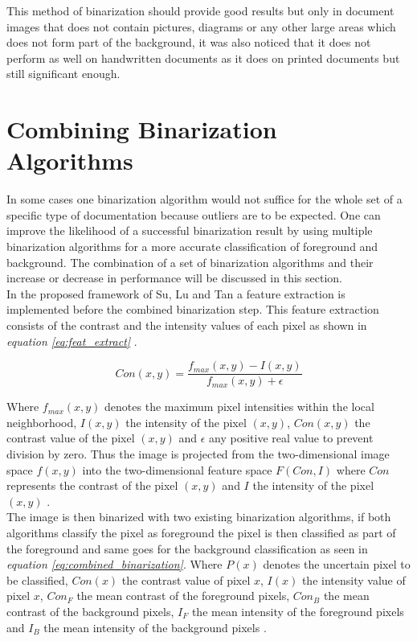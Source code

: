 \documentclass[11pt]{article}
\begin{document}
  			This method of binarization should provide good results but only in document images that does not contain pictures, diagrams or any other large areas which does not form part of the background, it was also noticed that it does not perform as well on handwritten documents as it does on printed documents but still significant enough.\\

				\newpage

        \section{Combining Binarization Algorithms}
      		In some cases one binarization algorithm would not suffice for the whole set of a specific type of documentation because outliers are to be expected. One can improve the likelihood of a successful binarization result by using multiple binarization algorithms for a more accurate classification of foreground and background. The combination of a set of binarization algorithms and their increase or decrease in performance will be discussed in this section.\\

      		In the proposed framework of Su, Lu and Tan \cite{su2011combination} a feature extraction is implemented before the combined binarization step. This feature extraction consists of the contrast and the intensity values of each pixel as shown in \textit{equation \ref{eq:feat_extract}} \cite{su2011combination}.

					\begin{large}
					\begin{equation} \label{eq:feat_extract}
						Con(x, y) = \frac{f_{max}(x, y) - I(x, y)}{f_{max}(x, y) + \epsilon}
					\end{equation}
					\end{large}

					Where $f_{max}(x, y)$ denotes the maximum pixel intensities within the local neighborhood, $I(x, y)$ the intensity of the pixel $(x, y)$, $Con(x, y)$ the contrast value of the pixel $(x, y)$ and $\epsilon$ any positive real value to prevent division by zero. Thus the image is projected from the two-dimensional image space $f(x, y)$ into the two-dimensional feature space $F(Con, I)$ where $Con$ represents the contrast of the pixel $(x, y)$ and $I$ the intensity of the pixel $(x, y)$ \cite{su2011combination}.\\

					The image is then binarized with two existing binarization algorithms, if both algorithms classify the pixel as foreground the pixel is then classified as part of the foreground and same goes for the background classification as seen in \textit{equation \ref{eq:combined_binarization}}. Where $P(x)$ denotes the uncertain pixel to be classified, $Con(x)$ the contrast value of pixel $x$, $I(x)$ the intensity value of pixel $x$, $Con_F$ the mean contrast of the foreground pixels, $Con_B$ the mean contrast of the background pixels, $I_F$ the mean intensity of the foreground pixels and $I_B$ the mean intensity of the background pixels \cite{su2011combination}.
\end{document}
